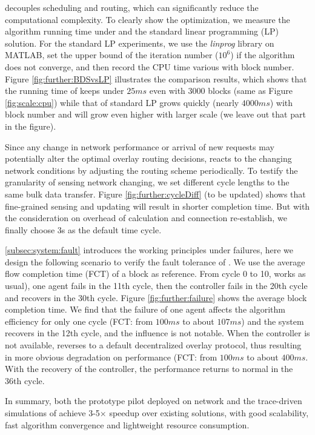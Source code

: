  \name decouples scheduling and routing, which can significantly reduce the computational complexity. To clearly show the optimization, we measure the algorithm running time under \name and the standard linear programming (LP) solution. For the standard LP experiments, we use the \textit{linprog} library on MATLAB, set the upper bound of the iteration number ($10^6$) if the algorithm does not converge, and then record the CPU time various with block number. Figure \ref{fig:further:BDSvsLP} illustrates the comparison results, which shows that the running time of \name keeps under $25ms$ even with 3000 blocks (same as Figure \ref{fig:scale:cpu}) while that of standard LP grows quickly (nearly $4000ms$) with block number and will grow even higher with larger scale (we leave out that part in the figure).

 Since any change in network performance or arrival of new requests may potentially alter the optimal overlay
routing decisions, \name reacts to the changing network conditions by adjusting the routing scheme periodically. To testify the granularity of sensing network changing, we set different cycle lengths to the same bulk data transfer. Figure \ref{fig:further:cycleDiff} (to be updated) shows that fine-grained sensing and updating will result in shorter completion time. But with the consideration on overhead of calculation and connection re-establish, we finally choose 3s as the default time cycle.

 \Section\ref{subsec:system:fault} introduces the working principles under failures, here we design the following scenario to verify the fault tolerance of \name. We use the average flow completion time (FCT) of a block as reference. From cycle 0 to 10, \name works as usual), one agent fails in the 11th cycle, then the controller fails in the 20th cycle and recovers in the 30th cycle. Figure \ref{fig:further:failure} shows the average block completion time. We find that the failure of one agent affects the algorithm efficiency for only one cycle (FCT: from $100ms$ to about $107ms$) and the system recovers in the 12th cycle, and the influence is not notable. When the controller is not available, \name reverses to a default decentralized overlay protocol, thus resulting in more obvious degradation on performance (FCT: from $100ms$ to about $400ms$. With the recovery of the controller, the performance returns to normal in the 36th cycle.

In summary, both the prototype pilot deployed on \company network and the trace-driven simulations of \name achieve 3-5$\times$ speedup over existing solutions, with good scalability, fast algorithm convergence and lightweight resource consumption.


